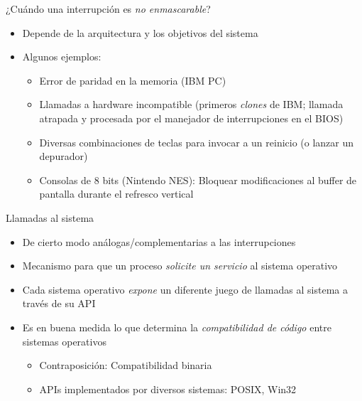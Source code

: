 \documentclass[presentation]{beamer}
\begin{document}
\begin{frame}[label={sec:org1e1d46f}]{¿Cuándo una interrupción es \emph{no enmascarable}?}
\begin{itemize}
\item Depende de la arquitectura y los objetivos del sistema
\item Algunos ejemplos:
\begin{itemize}
\item Error de paridad en la memoria (IBM PC)
\item Llamadas a hardware incompatible (primeros \emph{clones} de IBM;
llamada atrapada y procesada por el manejador de interrupciones en
el BIOS)
\item Diversas combinaciones de teclas para invocar a un reinicio (o
lanzar un depurador)
\item Consolas de 8 bits (Nintendo NES): Bloquear modificaciones al
buffer de pantalla durante el refresco vertical
\end{itemize}
\end{itemize}
\end{frame}

\begin{frame}[label={sec:orga887186}]{Llamadas al sistema}
\begin{itemize}
\item De cierto modo análogas/complementarias a las interrupciones
\item Mecanismo para que un proceso \emph{solicite un servicio} al sistema
operativo
\item Cada sistema operativo \emph{expone} un diferente juego de llamadas al
sistema a través de su API
\item Es en buena medida lo que determina la \emph{compatibilidad de código}
entre sistemas operativos
\begin{itemize}
\item Contraposición: Compatibilidad binaria
\item APIs implementados por diversos sistemas: POSIX, Win32
\end{itemize}
\end{itemize}
\end{frame}
\end{document}
